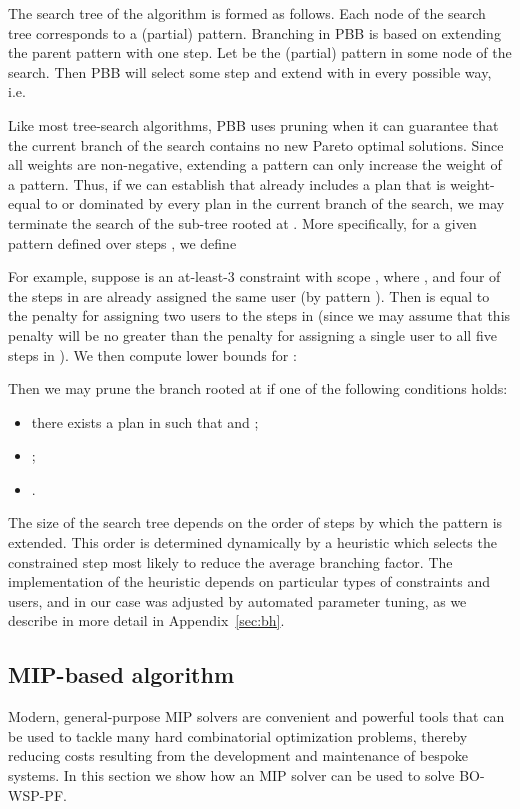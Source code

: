 \documentclass[jcs,crcready]{iosart1c}
\newcommand{\BOWSPPF}{\textsc{BO-WSP-PF}\xspace}
\begin{document}
 The search tree of the algorithm is formed as follows.
 Each node of the search tree corresponds to a (partial) pattern.
 Branching in PBB is based on extending the parent pattern with one step.
 Let  be the (partial) pattern in some node of the search.
 Then PBB will select some step  and extend  with  in every possible way, i.e.
 
 
 Like most tree-search algorithms, PBB uses pruning when it can guarantee that the current branch of the search contains no new Pareto optimal solutions.
 Since all weights are non-negative, extending a pattern can only increase the weight of a pattern.
 Thus, if we can establish that  already includes a plan that is weight-equal to or dominated by every plan in the current branch of the search, we may terminate the search of the sub-tree rooted at .
 More specifically, for a given pattern  defined over steps , we define
 
 For example, suppose  is an at-least-3 constraint with scope , where , and four of the steps in  are already assigned the same user (by pattern ).
 Then  is equal to the penalty for assigning two users to the steps in  (since we may assume that this penalty will be no greater than the penalty for assigning a single user to all five steps in ).
 We then compute lower bounds for :
 
 Then we may prune the branch rooted at  if one of the following conditions holds:
  \begin{itemize}
   \item there exists a plan  in  such that  and ;
   \item ;
   \item .
  \end{itemize}


 The size of the search tree depends on the order of steps by which the pattern is extended.
 This order is determined dynamically by a heuristic which selects the constrained step  most likely to reduce the average branching factor.
 The implementation of the heuristic depends on particular types of constraints and users, and in our case was adjusted by automated parameter tuning, as we describe in more detail in Appendix~\ref{sec:bh}.
 

\subsection{MIP-based algorithm}

 Modern, general-purpose MIP solvers are convenient and powerful tools that can be used to tackle many hard combinatorial optimization problems, thereby reducing costs resulting from the development and maintenance of bespoke systems.
 In this section we show how an MIP solver can be used to solve \BOWSPPF.
\end{document}
